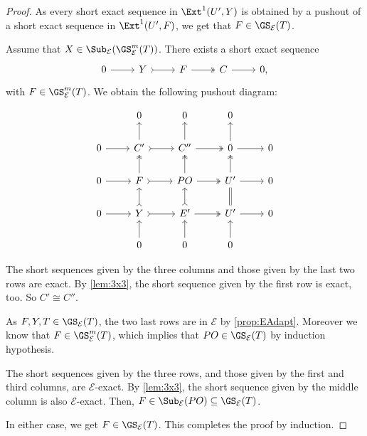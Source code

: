 \begin{proof}
As every short exact sequence in $\Ext^1(U',Y)$ is obtained by a pushout of a short exact sequence in $\Ext^1(U',F)$, we get that $F \in \GS_{\mathcal{E}}(T)$.

Assume that  $X \in \Sub_\mathcal{E}(\GS^{m}_{\mathcal{E}}(T))$. There exists a short exact sequence \[\begin{tikzcd}
	0 & Y & F  & C&  0,
	\arrow[from=1-1, to=1-2]
	\arrow[tail, from=1-2, to=1-3]
	\arrow[two heads,from=1-3, to=1-4]
	\arrow[from=1-4, to=1-5]
\end{tikzcd} \] with $F \in \GS^{m}_{\mathcal{E}}(T)$. We obtain the following pushout diagram:

\[\begin{tikzcd}
         & 0 & 0 & 0 &  \\
	0 & C' & C''  & 0 &  0 \\
     0 & F & PO & U' & 0 \\
      0 & Y & E' & U' & 0 \\
       & 0 & 0 & 0 & 
	\arrow[from=2-1, to=2-2]
	\arrow[tail, from=2-2, to=2-3]
	\arrow[two heads,from=2-3, to=2-4]
	\arrow[from=2-4, to=2-5]
        \arrow[from=3-1, to=3-2]
	\arrow[tail, from=3-2, to=3-3]
	\arrow[two heads,from=3-3, to=3-4]
	\arrow[from=3-4, to=3-5]
        \arrow[from=4-1, to=4-2]
	\arrow[tail, from=4-2, to=4-3]
	\arrow[two heads,from=4-3, to=4-4]
	\arrow[from=4-4, to=4-5]
        \arrow[from=5-2, to=4-2]
	\arrow[tail, from=4-2, to=3-2]
	\arrow[two heads,from=3-2, to=2-2]
	\arrow[from=2-2, to=1-2]
        \arrow[from=5-3, to=4-3]
	\arrow[tail, from=4-3, to=3-3]
	\arrow[two heads,from=3-3, to=2-3]
	\arrow[from=2-3, to=1-3]
        \arrow[from=5-4, to=4-4]
	\arrow[equals, from=4-4, to=3-4]
	\arrow[two heads,from=3-4, to=2-4]
	\arrow[from=2-4, to=1-4]
\end{tikzcd} \]

The short sequences given by the three columns and those given by the last two rows are exact. By \cref{lem:3x3}, the short sequence given by the first row is exact, too. So $C' \cong C''$.

As $F,Y,T \in \GS_{\mathcal{E}}(T)$, the two last rows are in $\mathcal{E}$ by \cref{prop:EAdapt}. Moreover we know that $F \in \GS^{m}_{\mathcal{E}}(T)$, which implies that $PO \in \GS_{\mathcal{E}}(T)$ by induction hypothesis.

The short sequences given by the three rows, and those given by the first and third columns, are $\mathcal{E}$-exact. By \cref{lem:3x3}, the short sequence given by the middle column is also $\mathcal{E}$-exact. Then, $F \in \Sub_\mathcal{E}(PO) \subseteq \GS_{\mathcal{E}}(T)$. 

In either case, we get $F \in \GS_\mathcal{E}(T)$. This completes the proof by induction.
\end{proof}

